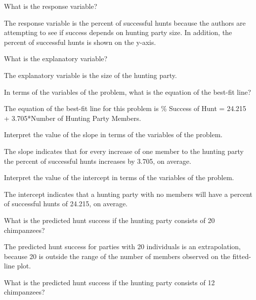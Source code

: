 \documentclass[10pt,openany]{book}\usepackage[]{graphicx}\usepackage[]{color}
\begin{document}
\begin{QAlist}
  \item What is the response variable?
  \begin{QAlist}
    \item The response variable is the percent of successful hunts because the authors are attempting to see if success depends on hunting party size.  In addition, the percent of successful hunts is shown on the y-axis.
  \end{QAlist}
  \item What is the explanatory variable?
  \begin{QAlist}
    \item The explanatory variable is the size of the hunting party.
  \end{QAlist}
  \item In terms of the variables of the problem, what is the equation of the best-fit line?
  \begin{QAlist}
    \item The equation of the best-fit line for this problem is \% Success of Hunt = 24.215 + 3.705*Number of Hunting Party Members.
  \end{QAlist}
  \item Interpret the value of the slope in terms of the variables of the problem.
  \begin{QAlist}
    \item The slope indicates that for every increase of one member to the hunting party the percent of successful hunts increases by 3.705, on average.
  \end{QAlist}
  \item Interpret the value of the intercept in terms of the variables of the problem.
  \begin{QAlist}
    \item The intercept indicates that a hunting party with no members will have a percent of successful hunts of 24.215, on average.
  \end{QAlist}
  \item What is the predicted hunt success if the hunting party consists of 20 chimpanzees?
  \begin{QAlist}
    \item The predicted hunt success for parties with 20 individuals is an extrapolation, because 20 is outside the range of the number of members observed on the fitted-line plot.
  \end{QAlist}
  \item What is the predicted hunt success if the hunting party consists of 12 chimpanzees?

\end{QAlist}
\end{document}
